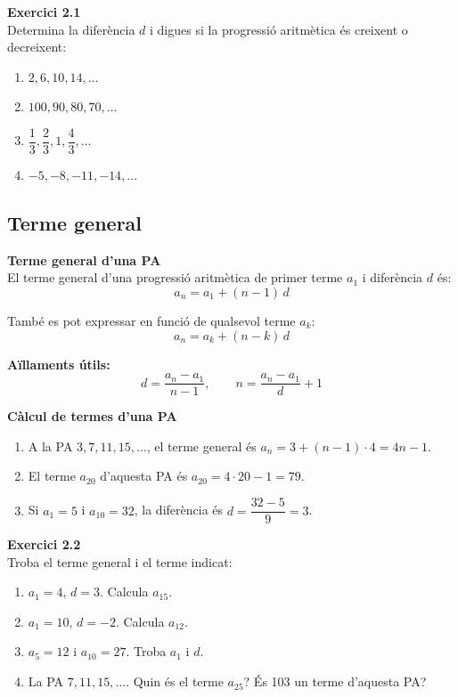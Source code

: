\documentclass[12pt]{article}
\begin{document}
\begin{exercici}
\textbf{Exercici 2.1}\\
Determina la diferència $d$ i digues si la progressió aritmètica és creixent o decreixent:
\begin{enumerate}[label=\alph*)]
    \item $2, 6, 10, 14, \dots$
    \item $100, 90, 80, 70, \dots$
    \item $\dfrac{1}{3}, \dfrac{2}{3}, 1, \dfrac{4}{3}, \dots$
    \item $-5, -8, -11, -14, \dots$
\end{enumerate}
\end{exercici}

\subsection{Terme general}

\begin{concept}
\textbf{Terme general d'una PA}\\
El terme general d'una progressió aritmètica de primer terme $a_1$ i diferència $d$ és:
\[
\boxed{a_n = a_1 + (n-1) \, d}
\]

També es pot expressar en funció de qualsevol terme $a_k$:
\[
a_n = a_k + (n-k) \, d
\]

\textbf{Aïllaments útils:}
\[
d = \dfrac{a_n - a_1}{n-1}, \qquad n = \dfrac{a_n - a_1}{d} + 1
\]
\end{concept}

\begin{exemple}
\textbf{Càlcul de termes d'una PA}
\begin{enumerate}[label=\alph*)]
    \item A la PA $3, 7, 11, 15, \dots$, el terme general és $a_n = 3 + (n-1)\cdot 4 = 4n - 1$.
    \item El terme $a_{20}$ d'aquesta PA és $a_{20} = 4 \cdot 20 - 1 = 79$.
    \item Si $a_1 = 5$ i $a_{10} = 32$, la diferència és $d = \dfrac{32-5}{9} = 3$.
\end{enumerate}
\end{exemple}

\begin{exercici}
\textbf{Exercici 2.2}\\
Troba el terme general i el terme indicat:
\begin{enumerate}[label=\alph*)]
    \item $a_1 = 4$, $d = 3$. Calcula $a_{15}$.
    \item $a_1 = 10$, $d = -2$. Calcula $a_{12}$.
    \item $a_5 = 12$ i $a_{10} = 27$. Troba $a_1$ i $d$.
    \item La PA $7, 11, 15, \dots$. Quin és el terme $a_{25}$? És 103 un terme d'aquesta PA?
\end{enumerate}
\end{exercici}
\end{document}
